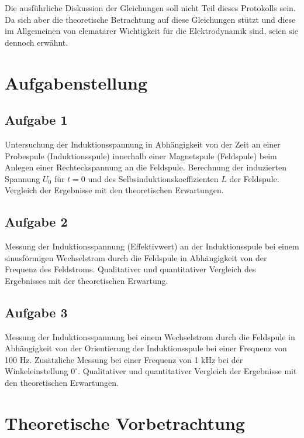 \documentclass{article}
\begin{document}
\noindent
Die ausführliche Diskussion der Gleichungen soll nicht Teil dieses Protokolls sein. Da sich aber die theoretische Betrachtung auf diese Gleichungen stützt und diese im Allgemeinen von elematarer Wichtigkeit für die Elektrodynamik sind, seien sie dennoch erwähnt.

\section{Aufgabenstellung}
\subsection*{Aufgabe 1}
Untersuchung der Induktionsspannung in Abhängigkeit von der Zeit an einer Probespule (Induktionsspule) innerhalb einer Magnetspule (Feldspule) beim Anlegen einer Rechteckspannung an die Feldspule. Berechnung der induzierten Spannung \(U_0\) für \(t=0\) und des Selbsinduktionskoeffizienten \(L\) der Feldspule. Vergleich der Ergebnisse mit den theoretischen Erwartungen.
\subsection*{Aufgabe 2}
Messung der Induktionsspannung (Effektivwert) an der Induktionsspule bei einem sinusförmigen Wechselstrom durch die Feldspule in Abhängigkeit von der Frequenz des Feldstroms. Qualitativer und quantitativer Vergleich des Ergebnisses mit der theoretischen Erwartung.
\subsection*{Aufgabe 3}
Messung der Induktionsspannung bei einem Wechselstrom durch die Feldspule in Abhängigkeit von der Orientierung der Induktionsspule bei einer Frequenz von 100 Hz. Zusätzliche Messung bei einer Frequenz von 1 kHz bei der Winkeleinstellung \(0^\circ \). Qualitativer und quantitativer Vergleich der Ergebnisse mit den theoretischen Erwartungen.

\section{Theoretische Vorbetrachtung}
\end{document}
